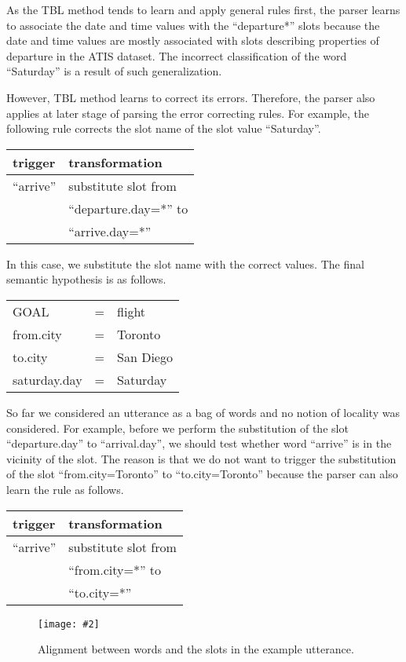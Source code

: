 \documentclass[11pt]{article}
\newcommand{\fgrparam}[4]{
  \begin{figure}[htbp]
    \begin{center}
      \leavevmode
      \texttt{[image: \#2]}
    \end{center}
    \caption{#4}
    \label{#3}
  \end{figure}
}
\begin{document}
As the TBL method tends to learn and apply general rules first, the parser learns to associate the date and time values with the ``departure*'' slots because the date and time values are mostly associated with slots describing properties of departure in the ATIS dataset. The incorrect classification of the word ``Saturday'' is a result of such generalization. 

However, TBL method learns to correct its errors. Therefore, the parser also applies at later stage of parsing the error correcting rules. For example, the following rule corrects the slot name of the slot value ``Saturday''.

\vspace{.25cm}
\begin{tabular}{ll}
  trigger & transformation \\
  \hline 
  ``arrive''            & substitute slot from\\
                        & ``departure.day=*'' to \\
                        & ``arrive.day=*'' \\
\end{tabular} 
\vspace{.25cm}

In this case, we substitute the slot name with the correct values. The final semantic hypothesis is as follows.

\vspace{.25cm}
\begin{tabular}{lll}
  GOAL          & = & flight \\
  from.city     & = & Toronto \\
  to.city       & = & San Diego \\
  saturday.day & = & Saturday \\
\end{tabular} 
\vspace{.25cm}

So far we considered an utterance as a bag of words and no notion of locality was considered. For example, before we perform the substitution of the slot ``departure.day'' to ``arrival.day'', we should test whether word ``arrive'' is in the vicinity of the slot. The reason is that we do not want to trigger the substitution of the slot ``from.city=Toronto'' to ``to.city=Toronto'' because the parser can also learn the rule as follows. 

\vspace{.25cm}
\begin{tabular}{ll}
  trigger & transformation \\
  \hline 
  ``arrive''            & substitute slot from\\
                        & ``from.city=*'' to \\
                        & ``to.city=*'' \\
\end{tabular} 
\vspace{.25cm}
\fgrparam{width=8cm}{./fig/words-slots-alignment.pdf}{fig:alignment}{Alignment between words and the slots in the example utterance.}
\end{document}
